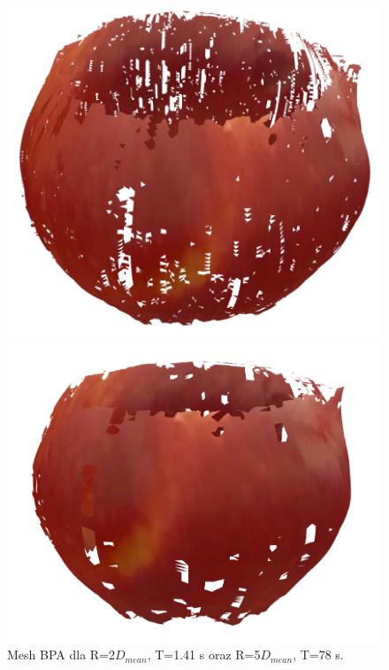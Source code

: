 \begin{figure}[H]
\centering
    \begin{minipage}[b]{0.45\linewidth}
        \includegraphics[scale=0.3]{bpaApple2x.PNG}
    \end{minipage}
\quad
    \begin{minipage}[b]{0.45\linewidth}
        \includegraphics[scale=0.3]{bpaApple5x.PNG}
    \end{minipage}
\caption{Mesh BPA dla R=2$D_{mean}$, T=1.41 s oraz R=5$D_{mean}$, T=78 s.}
\label{fig:appleComparison1}
\end{figure}

